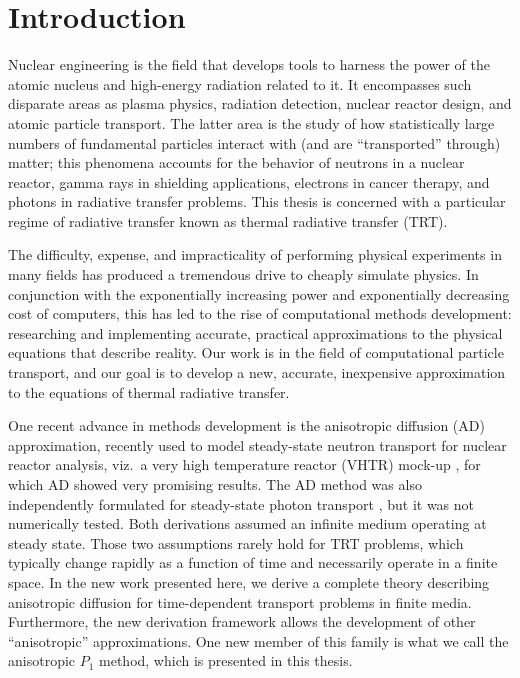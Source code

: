 
\chapter{Introduction}\label{chap:introduction}

Nuclear engineering is the field that develops tools to harness the power of the
atomic nucleus and high-energy radiation related to it. It encompasses such
disparate areas as plasma physics, radiation detection, nuclear reactor design,
and atomic particle transport. The latter area is the study of how
statistically large numbers of fundamental particles interact with (and are
``transported'' through) matter; this
phenomena accounts for the behavior of neutrons in a nuclear reactor,
gamma rays in shielding applications, electrons in cancer therapy, and photons
in radiative transfer problems. This thesis is concerned with a
particular regime of radiative transfer known as thermal radiative transfer
(TRT).

The difficulty, expense, and impracticality of performing physical
experiments in many fields has produced a tremendous drive to cheaply
simulate physics. In conjunction with the exponentially
increasing power and exponentially decreasing cost of computers,
this has led to the rise of computational methods development:
researching and implementing accurate, practical approximations to the physical
equations that describe reality. Our work is in the field of computational
particle transport, and our goal is to develop a new, accurate, inexpensive
approximation to the equations of thermal radiative transfer.

One recent advance in methods development is the anisotropic diffusion (AD)
approximation, recently used to model steady-state neutron transport for
nuclear reactor analysis, viz.~a very high temperature reactor
(VHTR) mock-up \cite{Lar2009c,Tra2011}, for which AD showed very promising
results. The AD
method was also independently formulated for steady-state photon transport
\cite{Mor2007}, but it was not numerically tested.
Both derivations assumed an infinite medium operating at steady state.
Those two assumptions rarely hold for TRT problems, which typically change
rapidly as a
function of time and necessarily operate in a finite space. In the new
work presented here, we derive a complete theory describing anisotropic
diffusion for time-dependent transport problems in finite media. Furthermore,
the new derivation framework allows the development of other ``anisotropic''
approximations. One new member of this family is what we call the anisotropic
$P_1$ method, which is presented in this thesis.

